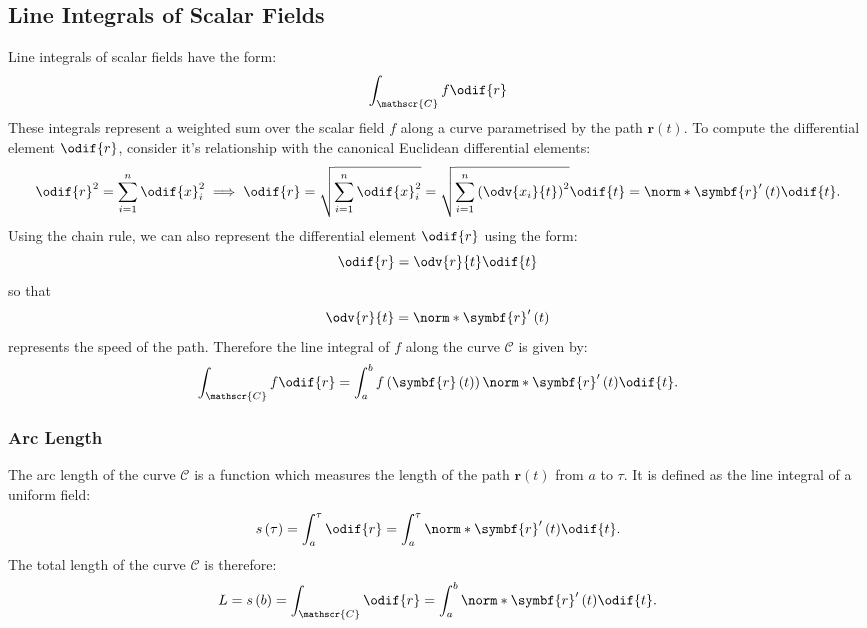\documentclass{article}
\begin{document}
\subsection{Line Integrals of Scalar Fields}
Line integrals of scalar fields have the form:
\begin{equation*}
    \int_{\mathscr{C}} f \odif{r}
\end{equation*}
These integrals represent a weighted sum over the scalar field \(f\)
along a curve parametrised by the path \(\symbf{r}\left( t \right)\).
To compute the differential element \(\odif{r}\), consider it's
relationship with the canonical Euclidean differential elements:
\begin{equation*}
    \odif{r}^2 = \sum_{i = 1}^n \odif{x}_i^2 \implies \odif{r} = \sqrt{\sum_{i = 1}^n \odif{x}_i^2} = \sqrt{\sum_{i = 1}^n \left( \odv{x_i}{t} \right)^2} \odif{t} = \norm*{\symbf{r}'\left( t \right)} \odif{t}.
\end{equation*}
Using the chain rule, we can also represent the differential element
\(\odif{r}\) using the form:
\begin{equation*}
    \odif{r} = \odv{r}{t} \odif{t}
\end{equation*}
so that
\begin{equation*}
    \odv{r}{t} = \norm*{\symbf{r}'\left( t \right)}
\end{equation*}
represents the speed of the path. Therefore the line integral of \(f\)
along the curve \(\mathscr{C}\) is given by:
\begin{equation*}
    \int_{\mathscr{C}} f \odif{r} = \int_a^b f\left( \symbf{r}\left( t \right) \right) \norm*{\symbf{r}'\left( t \right)} \odif{t}.
\end{equation*}
\subsubsection{Arc Length}
The arc length of the curve \(\mathscr{C}\) is a function which
measures the length of the path \(\symbf{r}\left( t \right)\) from
\(a\) to \(\tau\). It is defined as the line integral of a uniform
field:
\begin{equation*}
    s\left( \tau \right) = \int_a^\tau \odif{r} = \int_a^\tau \norm*{\symbf{r}'\left( t \right)} \odif{t}.
\end{equation*}
The total length of the curve \(\mathscr{C}\) is therefore:
\begin{equation*}
    L = s\left( b \right) = \int_{\mathscr{C}} \odif{r} = \int_a^b \norm*{\symbf{r}'\left( t \right)} \odif{t}.
\end{equation*}
\end{document}
